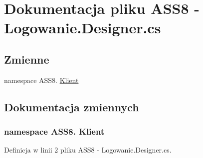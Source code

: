 \hypertarget{a00041}{
\section{Dokumentacja pliku ASS8 - Logowanie.Designer.cs}
\label{dd/d32/a00041}
}
\subsection*{Zmienne}
\begin{CompactItemize}
\item 
﻿namespace ASS8. \hyperlink{a00041_50d8d80fabd02a9a24fb725624e1ad24}{Klient}
\end{CompactItemize}


\subsection{Dokumentacja zmiennych}
\hypertarget{a00041_50d8d80fabd02a9a24fb725624e1ad24}{
\subsubsection[{Klient}]{\setlength{\rightskip}{0pt plus 5cm}﻿namespace ASS8. Klient}}
\label{dd/d32/a00041_50d8d80fabd02a9a24fb725624e1ad24}




Definicja w linii 2 pliku ASS8 - Logowanie.Designer.cs.
